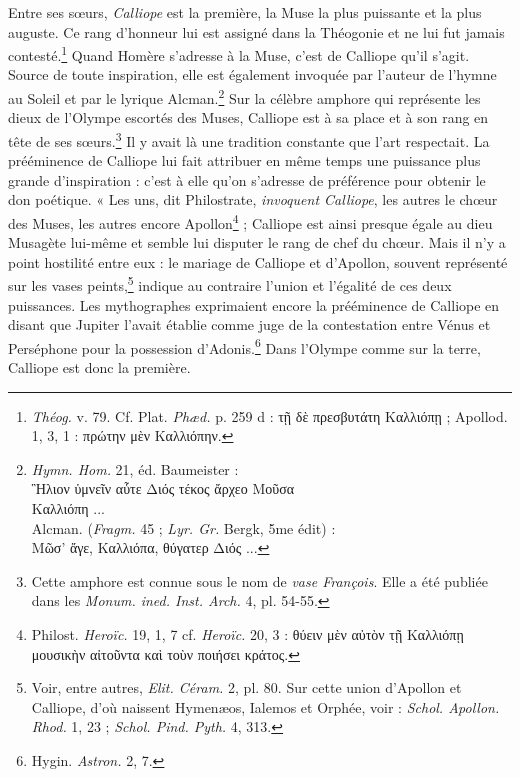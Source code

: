 \documentclass[landscape, a4paper, 11pt, oneside, polutonikogreek, french]{article}
\begin{document}
Entre ses sœurs, \emph{Calliope} est la première, la Muse la plus puissante et la plus auguste. Ce rang d'honneur lui est assigné dans la Théogonie et ne lui fut jamais contesté.\footnote{\emph{Théog.} v. 79. Cf. Plat. \emph{Phæd.} p. 259 d : τῇ δὲ πρεσβυτάτη Καλλιόπῃ ; Apollod. 1, 3, 1 : πρώτην μὲν Καλλιόπην.} Quand Homère s'adresse à la Muse, c'est de Calliope qu'il s'agit. Source de toute inspiration, elle est également invoquée par l'auteur de l'hymne au Soleil et par le lyrique Alcman.\footnote{\emph{Hymn. Hom.} 21, éd. Baumeister :\\\hspace*{10mm}Ἣλιον ὑμνεῖν αὗτε Διός τέκος ἄρχεο Μοῦσα\\\hspace*{10mm}Καλλιόπη ...\\\hspace*{5mm}Alcman. (\emph{Fragm.} 45 ; \emph{Lyr. Gr.} Bergk, 5me édit) :\\\hspace*{10mm}Μῶσ' ἄγε, Καλλιόπα, θύγατερ Διός ...} Sur la célèbre amphore qui représente les dieux de l'Olympe escortés des Muses, Calliope est à sa place et à son rang en tête de ses sœurs.\footnote{Cette amphore est connue sous le nom de \emph{vase François}. Elle a été publiée dans les \emph{Monum. ined. Inst. Arch.} 4, pl. 54-55.} Il y avait là une tradition constante que l'art respectait. La prééminence de Calliope lui fait attribuer en même temps une puissance plus grande d'inspiration : c'est à elle qu'on s'adresse de préférence pour obtenir le don poétique. « Les uns, dit Philostrate, \emph{invoquent Calliope}, les autres le chœur des Muses, les autres encore Apollon\footnote{Philost. \emph{Heroïc.} 19, 1, 7 cf. \emph{Heroïc.} 20, 3 : θύειν μὲν αὐτὸν τῇ Καλλιόπῃ μουσικὴν αἰτοῦντα καὶ τοὺν ποιήσει κράτος.} ; Calliope est ainsi presque égale au dieu Musagète lui-même et semble lui disputer le rang de chef du chœur. Mais il n'y a point hostilité entre eux : le mariage de Calliope et d'Apollon, souvent représenté sur les vases peints,\footnote{Voir, entre autres, \emph{Elit. Céram.} 2, pl. 80. Sur cette union d'Apollon et Calliope, d'où naissent Hymenæos, Ialemos et Orphée, voir : \emph{Schol. Apollon. Rhod.} 1, 23 ; \emph{Schol. Pind. Pyth.} 4, 313.} indique au contraire l'union et l'égalité de ces deux puissances. Les mythographes exprimaient encore la prééminence de Calliope en disant que Jupiter l'avait établie comme juge de la contestation entre Vénus et Perséphone pour la possession d'Adonis.\footnote{Hygin. \emph{Astron.} 2, 7.} Dans l'Olympe comme sur la terre, Calliope est donc la première.
\end{document}

